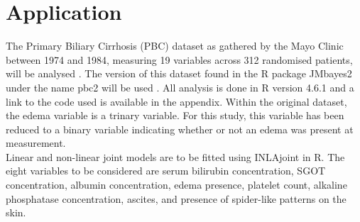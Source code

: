 \documentclass[english]{article}
\makeatletter
\theoremstyle{plain}
\newtheorem{thm}{\protect\theoremname}
\newenvironment{proof}[1][\protect\proofname]{\par
\normalfont\topsep6\p@\@plus6\p@\relax
\trivlist
\itemindent\parindent
\item[\hskip\labelsep\scshape #1]\ignorespaces
}{%
\endtrivlist\@endpefalse
}
\providecommand{\proofname}{Proof}
\providecommand{\theoremname}{Theorem}
\makeatother
\begin{document}

\section{Application}

The Primary Biliary Cirrhosis (PBC) dataset as gathered by the Mayo Clinic between 1974 and 1984, measuring 19 variables across 312 randomised patients, will be analysed \cite{fleming2020}. The version of this dataset found in the R package JMbayes2 under the name pbc2 will be used \cite{jmbayes2020}.  All analysis is done in R version 4.6.1 \cite{R2020} and a link to the code used is available in the appendix.
Within the original dataset, the edema variable is a trinary variable. For this study, this variable has been reduced to a binary variable indicating whether or not an edema was present at measurement.
\\

Linear and non-linear joint models are to be fitted using INLAjoint \cite{joint2020} in R.  The eight variables to be considered are  serum bilirubin concentration, SGOT concentration, albumin concentration, edema presence, platelet count, alkaline phosphatase concentration, ascites, and presence of spider-like patterns on the skin.
\\
\end{document}
